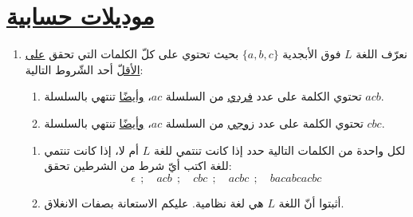 \documentclass[14pt]{extarticle}
\begin{document}
\pagestyle{empty}
\thispagestyle{empty}

\section*{\underline{موديلات حسابية}}
\begin{enumerate}[label=\arabic*., start=4]

\item
نعرّف اللغة $L$ فوق الأبجدية $\{a, b, c\}$ بحيث تحتوي على كلّ الكلمات التي تحقق \underline{على الأقلّ} أحد الشّروط التالية:
\begin{enumerate}[label=(\Roman*)]
    \item تحتوي الكلمة على عدد \underline{فردي} من السلسلة $ac$، \underline{وأيضًا} تنتهي بالسلسلة $acb$.
    \item تحتوي الكلمة على عدد \underline{زوجي} من السلسلة $ac$، \underline{وأيضًا} تنتهي بالسلسلة $cbc$.
\end{enumerate}
\vspace{1em}
\begin{enumerate}
    \item[أ.] لكل واحدة من الكلمات التالية حدد إذا كانت تنتمي للغة $L$ أم لا، إذا كانت تنتمي للغة اكتب أيّ شرط من الشرطين تحقق: \\
    \[ \epsilon \ \ ; \quad acb \ \ ; \quad cbc \ \ ; \quad acbc \ \ ; \quad bacabcacbc \]
    \item[ب.] أثبتوا أنّ اللغة $L$ هي لغة نظامية. عليكم الاستعانة بصفات الانغلاق.
\end{enumerate}


\end{enumerate}
\end{document}
